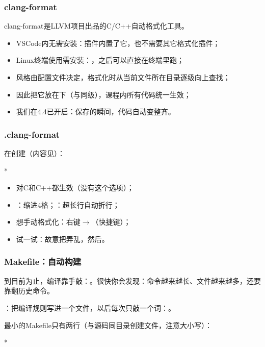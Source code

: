 \begin{frame}
    \frametitle{clang-format}
    clang-format是LLVM项目出品的C/C++自动格式化工具。
    \begin{itemize}
        \item \alert{VSCode内无需安装}：插件内置了它，也不需要其它格式化插件；
        \item \alert{Linux终端使用需安装}：，之后可以直接在终端里跑；
        \item 风格由配置文件决定，格式化时从当前文件所在目录\alert{逐级向上查找}；
        \item 因此把它放在下（与同级），课程内所有代码统一生效；
        \item 我们在4.4已开启：\alert{保存的瞬间，代码自动变整齐}。
    \end{itemize}
\end{frame}

\begin{frame}
    \frametitle{.clang-format}
    在创建（内容见）：
    \begin{Code}*
        
    \end{Code}

    \begin{itemize}
        \item {}对C和C++都生效（没有这个选项）；
        \item {}：缩进4格；：超长行自动折行；
        \item 想手动格式化：右键$\to$（快捷键）；
        \item 试一试：故意把弄乱，然后。
    \end{itemize}
\end{frame}

\begin{frame}
    \frametitle{Makefile：自动构建}
    到目前为止，编译靠手敲：。很快你会发现：命令越来越长、文件越来越多，还要靠\code{$\uparrow$}翻历史命令。

    ：把编译规则写进一个文件，以后每次只敲一个词：。

    最小的Makefile只有两行（与源码同目录创建文件，注意大小写）：
    \begin{Code}*
        
    \end{Code}
\end{frame}

